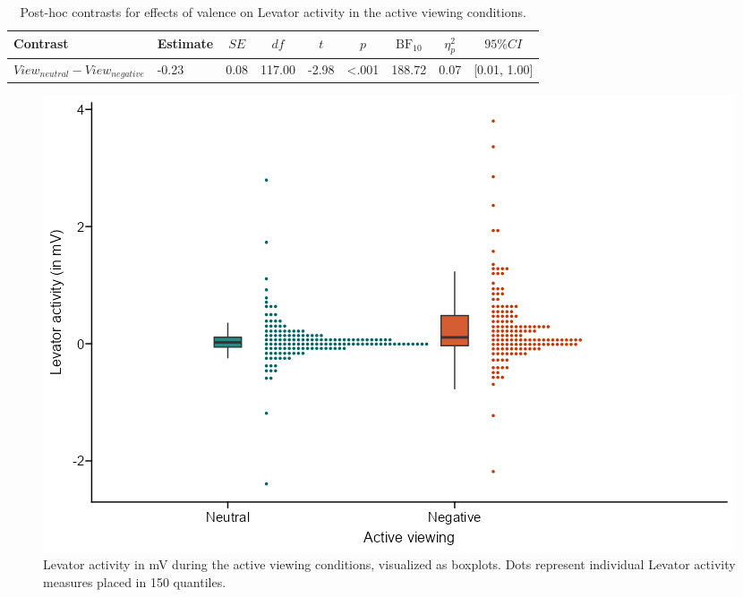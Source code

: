 \documentclass[
  man,floatsintext]{apa6}
\begin{document}
\begin{table}[H]

\begin{center}
\begin{threeparttable}

\caption{\label{tab:SupplEffectLevView}Post-hoc contrasts for effects of valence on Levator activity in the active viewing conditions.}

\footnotesize{

\begin{tabular}{lllllllll}
\toprule
Contrast & \multicolumn{1}{c}{Estimate} & \multicolumn{1}{c}{$SE$} & \multicolumn{1}{c}{$df$} & \multicolumn{1}{c}{$t$} & \multicolumn{1}{c}{$p$} & \multicolumn{1}{c}{$\mathrm{BF}_{\textrm{10}}$} & \multicolumn{1}{c}{$\eta_{p}^{2}$} & \multicolumn{1}{c}{$95\% CI$}\\
\midrule
$View_{neutral} - View_{negative}$ & -0.23 & 0.08 & 117.00 & -2.98 & <.001 & 188.72 & 0.07 & {}[0.01, 1.00]\\
\bottomrule
\end{tabular}

}

\end{threeparttable}
\end{center}

\end{table}

\begin{figure}[H]
\includegraphics[width=\textwidth]{figures/FigLevView} \caption{Levator activity in mV during the active viewing conditions, visualized as boxplots. Dots represent individual Levator activity measures placed in 150 quantiles.}\label{fig:SupplFigLevView}
\end{figure}
\end{document}
